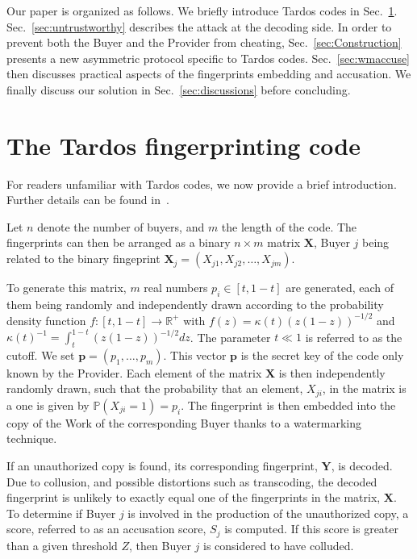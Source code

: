 \documentclass{article}
\def\longu{m}
\begin{document}
Our paper is organized as follows. We briefly
  introduce Tardos codes in Sec.~\ref{sec:tardos}.  
  Sec.~\ref{sec:untrustworthy} describes the attack
  at the decoding side.  In order to
  prevent both the Buyer and the Provider from cheating, 
  Sec.~\ref{sec:Construction} presents a new asymmetric protocol
  specific to Tardos codes. Sec.~\ref{sec:wmaccuse} then discusses
  practical aspects of the fingerprints embedding and accusation.  We
  finally discuss our solution in Sec.~\ref{sec:discussions} before
  concluding.


\section{The Tardos fingerprinting code}
\label{sec:tardos}

For readers unfamiliar with Tardos codes, we now provide a brief
introduction. Further details can be found in~\cite{SkoricSymmetric}. 

Let $n$ denote the number of buyers, and $\longu$ the length of the
code. The fingerprints can then be arranged as a binary $n \times
\longu$ matrix $\mathbf{X}$, Buyer $j$ being related to the binary
fingeprint $\mathbf{X}_j = (X_{j1}, X_{j2}, \ldots , X_{j\longu})$.

To generate this matrix, $m$ real numbers $p_i\in[t,1-t]$ are
generated, each of them being randomly and independently drawn
according to the probability density function
$f:[t,1-t]\rightarrow\mathbb{R}^+$ with $f(z)=\kappa(t)
(z(1-z))^{-1/2}$ and $\kappa(t)^{-1}=\int_t^{1-t}(z(1-z))^{-1/2}dz$.
The parameter $t\ll 1$ is referred to as the cutoff. We set
$\mathbf{p}=(p_1,\ldots,p_{\longu})$. This vector $\mathbf{p}$ is the
secret key of the code only known by the Provider.
Each element of the matrix $\mathbf{X}$ is then
independently randomly drawn, such that the probability that an
element, $X_{ji}$, in the matrix is a one is given by
$\mathbb{P}(X_{ji} = 1) = p_i$. The fingerprint is then embedded
into the copy of the Work of the corresponding Buyer thanks to a watermarking technique.

If an unauthorized copy is found, its corresponding fingerprint,
$\mathbf{Y}$, is decoded.  Due to collusion, and possible distortions
such as transcoding, the decoded fingerprint is unlikely to exactly
equal one of the fingerprints in the matrix, $\mathbf{X}$.  To
determine if Buyer $j$ is involved in the production of the
unauthorized copy, a score, referred to as an accusation score, $S_j$
is computed.  If this score is greater than a given threshold $Z$,
then Buyer $j$ is considered to have colluded.
\end{document}
